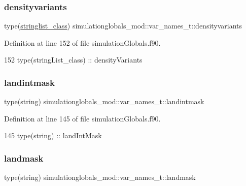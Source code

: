 \subsubsection{\texorpdfstring{densityvariants}{densityvariants}}
{\footnotesize\ttfamily type(\mbox{\hyperlink{structsimulationglobals__mod_1_1stringlist__class}{stringlist\+\_\+class}}) simulationglobals\+\_\+mod\+::var\+\_\+names\+\_\+t\+::densityvariants\hspace{0.3cm}{\ttfamily [private]}}



Definition at line 152 of file simulation\+Globals.\+f90.


\begin{DoxyCode}
152         \textcolor{keywordtype}{type}(stringList\_class) :: densityVariants
\end{DoxyCode}
\mbox{\label{structsimulationglobals__mod_1_1var__names__t_a200a4d2d418449d20df4d5d61eaef041}} 
\subsubsection{\texorpdfstring{landintmask}{landintmask}}
{\footnotesize\ttfamily type(string) simulationglobals\+\_\+mod\+::var\+\_\+names\+\_\+t\+::landintmask\hspace{0.3cm}{\ttfamily [private]}}



Definition at line 145 of file simulation\+Globals.\+f90.


\begin{DoxyCode}
145         \textcolor{keywordtype}{type}(string) :: landIntMask
\end{DoxyCode}
\mbox{\label{structsimulationglobals__mod_1_1var__names__t_a7f6f2e084fda25ccc0fe911e3a46fafe}} 
\subsubsection{\texorpdfstring{landmask}{landmask}}
{\footnotesize\ttfamily type(string) simulationglobals\+\_\+mod\+::var\+\_\+names\+\_\+t\+::landmask\hspace{0.3cm}{\ttfamily [private]}}



